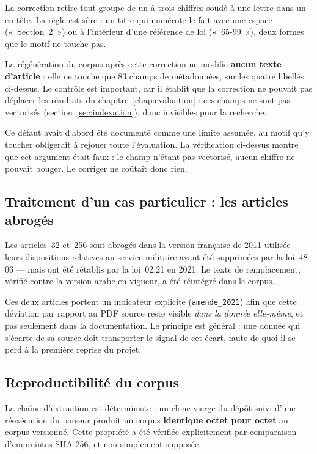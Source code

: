 \noindent La correction retire tout groupe de un à trois chiffres soudé à une lettre dans un
en-tête. La règle est sûre : un titre qui numérote le fait avec une espace («~Section~2~») ou à
l'intérieur d'une référence de loi («~65-99~»), deux formes que le motif ne touche pas.

\begin{constat}
La régénération du corpus après cette correction ne modifie \textbf{aucun texte d'article} : elle
ne touche que 83 champs de métadonnées, sur les quatre libellés ci-dessus. Le contrôle est
important, car il établit que la correction ne pouvait pas déplacer les résultats du
chapitre~\ref{chap:evaluation} : ces champs ne sont pas vectorisés
(section~\ref{sec:indexation}), donc invisibles pour la recherche.

\smallskip
Ce défaut avait d'abord été documenté comme une limite assumée, au motif qu'y toucher obligerait à
rejouer toute l'évaluation. La vérification ci-dessus montre que cet argument était faux : le
champ n'étant pas vectorisé, aucun chiffre ne pouvait bouger. Le corriger ne coûtait donc rien.
\end{constat}

\subsection{Traitement d'un cas particulier : les articles abrogés}

Les articles~32 et~256 sont abrogés dans la version française de 2011 utilisée --- leurs
dispositions relatives au service militaire ayant été supprimées par la loi~48-06 --- mais ont été
rétablis par la loi~02.21 en 2021. Le texte de remplacement, vérifié contre la version arabe en
vigueur, a été réintégré dans le corpus.

Ces deux articles portent un indicateur explicite (\texttt{amende\_2021}) afin que cette
déviation par rapport au PDF source reste visible \emph{dans la donnée elle-même}, et pas seulement
dans la documentation. Le principe est général : une donnée qui s'écarte de sa source doit
transporter le signal de cet écart, faute de quoi il se perd à la première reprise du projet.

\subsection{Reproductibilité du corpus}

La chaîne d'extraction est déterministe : un clone vierge du dépôt suivi d'une réexécution du
parseur produit un corpus \textbf{identique octet pour octet} au corpus versionné. Cette propriété
a été vérifiée explicitement par comparaison d'empreintes SHA-256, et non simplement supposée.

